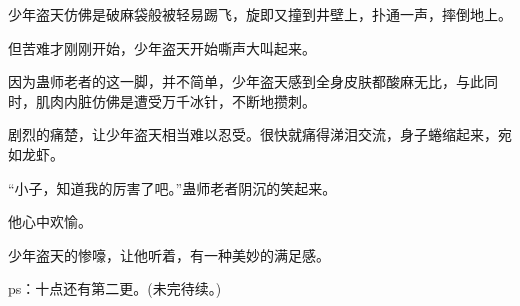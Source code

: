 \begin{this_body}
少年盗天仿佛是破麻袋般被轻易踢飞，旋即又撞到井壁上，扑通一声，摔倒地上。

但苦难才刚刚开始，少年盗天开始嘶声大叫起来。

因为蛊师老者的这一脚，并不简单，少年盗天感到全身皮肤都酸麻无比，与此同时，肌肉内脏仿佛是遭受万千冰针，不断地攒刺。

剧烈的痛楚，让少年盗天相当难以忍受。很快就痛得涕泪交流，身子蜷缩起来，宛如龙虾。

“小子，知道我的厉害了吧。”蛊师老者阴沉的笑起来。

他心中欢愉。

少年盗天的惨嚎，让他听着，有一种美妙的满足感。

ps：十点还有第二更。(未完待续。)

\end{this_body}

